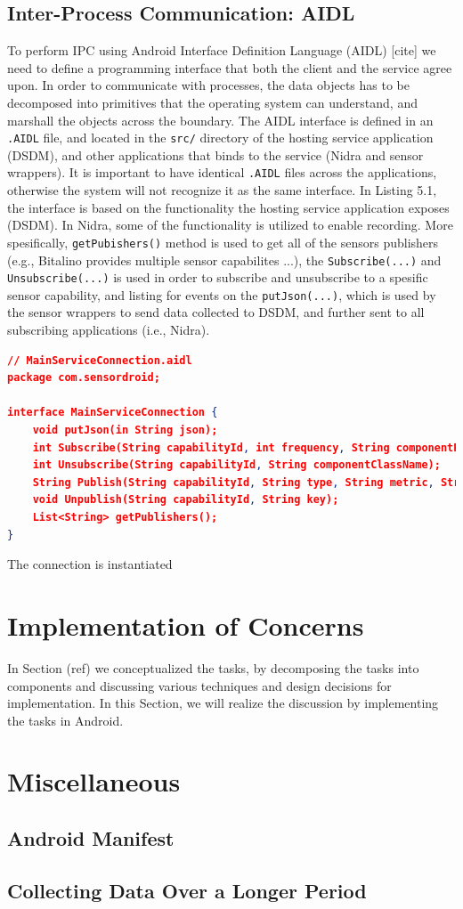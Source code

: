 \subsection{Inter-Process Communication: AIDL}
To perform IPC using Android Interface Definition Language (AIDL) [cite] we need to define a programming interface that both the client and the service agree upon. In order to communicate with processes, the data objects has to be decomposed into primitives that the operating system can understand, and marshall the objects across the boundary. The AIDL interface is defined in an \verb|.AIDL| file, and located in the \verb|src/| directory of the hosting service application (DSDM), and other applications that binds to the service (Nidra and sensor wrappers). It is important to have identical \verb|.AIDL| files across the applications, otherwise the system will not recognize it as the same interface. In Listing 5.1, the interface is based on the functionality the hosting service application exposes (DSDM). In Nidra, some of the functionality is utilized to enable recording. More spesifically, \verb|getPubishers()| method is used to get all of the sensors publishers (e.g., Bitalino provides multiple sensor capabilites ...), the \verb|Subscribe(...)| and \verb|Unsubscribe(...)| is used in order to subscribe and unsubscribe to a spesific sensor capability, and listing for events on the \verb|putJson(...)|, which is used by the sensor wrappers to send data collected to DSDM, and further sent to all subscribing applications (i.e., Nidra). 


\begin{lstlisting}[language=json, caption={My Caption}, captionpos=b]
// MainServiceConnection.aidl
package com.sensordroid;

interface MainServiceConnection {
    void putJson(in String json);
    int Subscribe(String capabilityId, int frequency, String componentPackageName, String componentClassName);
    int Unsubscribe(String capabilityId, String componentClassName);
    String Publish(String capabilityId, String type, String metric, String description);
    void Unpublish(String capabilityId, String key);
    List<String> getPublishers();
}
\end{lstlisting}

The connection is instantiated 


\section{Implementation of Concerns}
In Section (ref) we conceptualized the tasks, by decomposing the tasks into components and discussing various techniques and design decisions for implementation. In this Section, we will realize the discussion by implementing the tasks in Android. 



\section{Miscellaneous}
\subsection{Android Manifest}
\subsection{Collecting Data Over a Longer Period}
